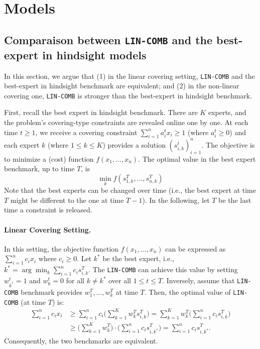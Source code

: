 
\section{Models}


\subsection{Comparaison between \texttt{LIN-COMB} and the best-expert in hindsight models}		\label{sec:comparaison}
In this section, we argue that (1) in the linear covering setting, \texttt{LIN-COMB} and the best-expert in hindsight benchmark are equivalent;
and (2) in the non-linear covering one,  \texttt{LIN-COMB} is stronger than the best-expert in hindsight benchmark.

First, recall the best expert in hindsight benchmark. There are $K$ experts, and the problem's covering-type constraints are revealed online one by one.
At each time $t \geq 1$, we receive a covering constraint $\sum_{i=1}^{n} a_{i}^{t} x_{i} \geq 1$ (where $a_{i}^{t} \geq 0$) and each expert $k$ (where $1 \leq k \leq K$) provides
a solution $(s_{i,k}^{t})_{i=1}^{n}$. The objective is to minimize a (cost) function $f(x_{1}, \ldots, x_{n})$. The optimal value in the best expert benchmark, up to time $T$, is
$$
\min_{k} f(s_{1,k}^{T}, \ldots, s_{n,k}^{T})
$$
%
Note that the best experts can be changed over time (i.e., the best expert at time $T$ might be different to the one at time $T-1$).
In the following, let $T$ be the last time a constraint is released.

\paragraph{Linear Covering Setting.} In this setting, the objective function $f(x_{1}, \ldots, x_{n})$ can be expressed as $\sum_{i=1}^{n} c_{i} x_{i}$ where $c_{i} \geq 0$.
Let $k^{*}$ be the best expert, i.e., $k^{*} = \arg \min_{k} \sum_{i=1}^{n} c_{i} s_{i,k}^{T}$. The \texttt{LIN-COMB} can achieve this value by setting
$w_{k^{*}}^{t} = 1$ and $w_{k}^{t} = 0$ for all $k \neq k^{*}$ over all $1 \leq t \leq T$. Inversely, assume that \texttt{LIN-COMB} benchmark provides $w_{1}^{T}, \ldots, w_{k}^{T}$
at time $T$. Then, the optimal value of \texttt{LIN-COMB} (at time $T$) is:
\begin{align*}
\sum_{i=1}^{n} c_{i} x_{i} &\geq \sum_{i=1}^{n} c_{i} \biggl( \sum_{k=1}^{K} w_{k}^{T} s_{i,k}^{T} \biggr)
= \sum_{k=1}^{K} w_{k}^{T}  \biggl( \sum_{i=1}^{n} c_{i} s_{i,k}^{T} \biggr) \\
%
&\geq \biggl ( \sum_{k=1}^{K} w_{k}^{T} \biggr) \cdot \biggl( \sum_{i=1}^{n} c_{i} s_{i,k^{*}}^{T} \biggr)
=  \sum_{i=1}^{n} c_{i} s_{i,k^{*}}^{T}.
\end{align*}
%
Consequently, the two benchmarks are equivalent.

